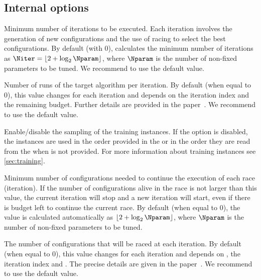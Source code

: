 \subsection[Internal irace options]{Internal \irace options}
\begin{description}
Minimum number of iterations to be executed. Each iteration involves the generation of new configurations and the use of racing to select the best configurations. By default (with 0), \irace calculates the minimum number of iterations as $\Niter = \lfloor 2 + \log_{2}\Nparam \rfloor$, where $\Nparam$ is the number of non-fixed parameters to be tuned. We recommend to use the default value.

Number of runs of the target algorithm per iteration. By default (when equal to 0), this value changes for each iteration and depends on the iteration index and the remaining budget. Further details are provided in the \irace paper~\citep{LopDubPerStuBir2016irace}.
We recommend to use the default value.

Enable/disable the sampling of the training instances. If the option  is disabled, the instances are used in the order provided in the  or in the order they are read from the  when is not provided. For more information about training instances see \autoref{sec:training}.

Minimum number of configurations needed to continue the execution of each race (iteration). If the number of configurations alive in the race is not larger than this value, the current iteration will stop and a new iteration will start, even if there is budget left to continue the current race. By default (when equal to 0), the value is calculated automatically as $\lfloor 2 + \log_{2}\Nparam \rfloor$, where $\Nparam$ is the number of non-fixed parameters to be tuned.

  The number of configurations that will be raced at each iteration. By default (when equal to 0), this value changes for each iteration and depends on , the iteration index and . The precise details are given in the \irace paper~\citep{LopDubPerStuBir2016irace}.
We recommend to use the default value.


\end{description}
